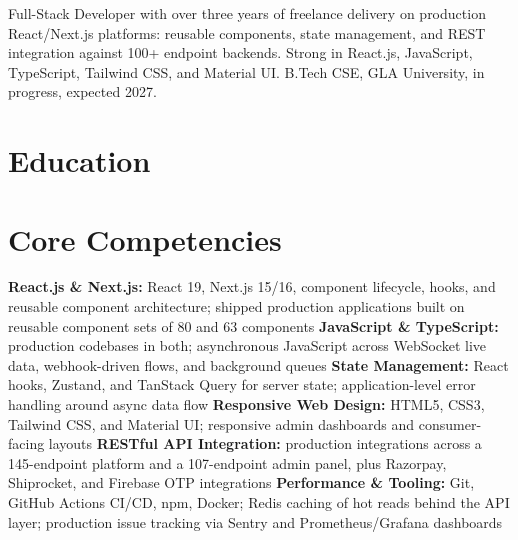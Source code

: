 \documentclass[11pt,a4paper,sans]{moderncv}
\begin{document}
\makecvtitle


\vspace{4pt}
\small{Full-Stack Developer with over three years of freelance delivery on production React/Next.js platforms: reusable components, state management, and REST integration against 100+ endpoint backends. Strong in React.js, JavaScript, TypeScript, Tailwind CSS, and Material UI. B.Tech CSE, GLA University, in progress, expected 2027.}


\section{Education}
\vspace{1pt}


\section{Core Competencies}
\vspace{1pt}
\raggedright
\textbf{React.js \& Next.js:} React 19, Next.js 15/16, component lifecycle, hooks, and reusable component architecture; shipped production applications built on reusable component sets of 80 and 63 components \textbar{}
\textbf{JavaScript \& TypeScript:} production codebases in both; asynchronous JavaScript across WebSocket live data, webhook-driven flows, and background queues \textbar{}
\textbf{State Management:} React hooks, Zustand, and TanStack Query for server state; application-level error handling around async data flow \textbar{}
\textbf{Responsive Web Design:} HTML5, CSS3, Tailwind CSS, and Material UI; responsive admin dashboards and consumer-facing layouts \textbar{}
\textbf{RESTful API Integration:} production integrations across a 145-endpoint platform and a 107-endpoint admin panel, plus Razorpay, Shiprocket, and Firebase OTP integrations \textbar{}
\textbf{Performance \& Tooling:} Git, GitHub Actions CI/CD, npm, Docker; Redis caching of hot reads behind the API layer; production issue tracking via Sentry and Prometheus/Grafana dashboards
\par\normalfont
\end{document}
